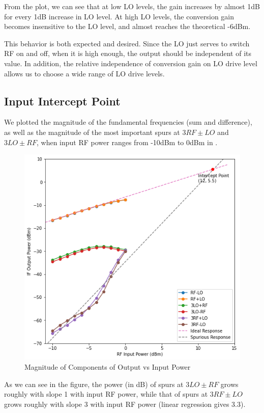 \documentclass{article}
\begin{document}
From the plot, we can see that at low LO levels, the gain increases by almost 1dB for every 1dB increase in LO level.
At high LO levels, the conversion gain becomes insensitive to the LO level, and almost reaches the theoretical -6dBm.

This behavior is both expected and desired.
Since the LO just serves to switch RF on and off, when it is high enough, the output should be independent of its value.
In addition, the relative independence of conversion gain on LO drive level allows us to choose a wide range of LO drive levels.

\subsection{Input Intercept Point}
We plotted the magnitude of the fundamental frequencies (sum and difference), as well as the magnitude of the most important spurs at $3RF\pm LO$ and $3LO \pm RF$, when input RF power ranges from -10dBm to 0dBm in .

\begin{figure}[h]
    \centering
    \includegraphics[width=0.8\linewidth]{./pics/intercept.png}
    \caption{Magnitude of Components of Output vs Input Power}
    \label{fig:intercept}
\end{figure}

As we can see in the figure, the power (in dB) of spurs at $3LO \pm RF$ grows roughly with slope 1 with input RF power, while that of spurs at $3RF \pm LO$ grows roughly with slope 3 with input RF power (linear regression gives 3.3).
\end{document}

